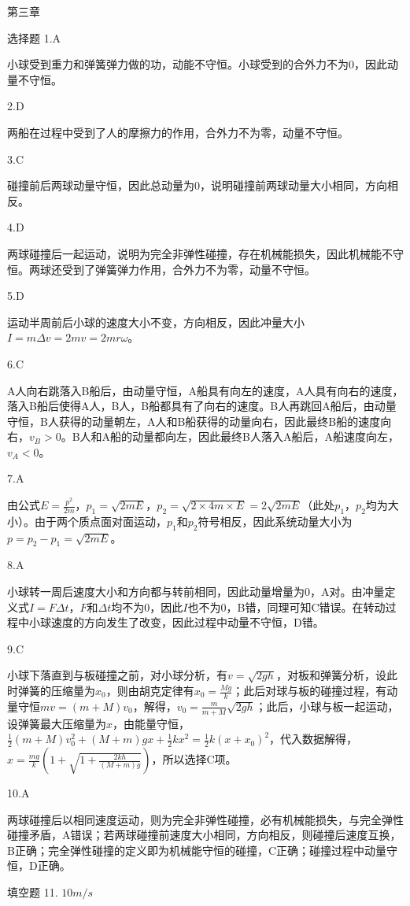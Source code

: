 \documentclass[a4paper,fleqn,twocolumn]{ctexart}
\begin{document}
\begin{section}{第三章}
\begin{subsection}{选择题}
1.A

小球受到重力和弹簧弹力做的功，动能不守恒。小球受到的合外力不为0，因此动量不守恒。

2.D

两船在过程中受到了人的摩擦力的作用，合外力不为零，动量不守恒。

3.C

碰撞前后两球动量守恒，因此总动量为0，说明碰撞前两球动量大小相同，方向相反。

4.D

两球碰撞后一起运动，说明为完全非弹性碰撞，存在机械能损失，因此机械能不守恒。两球还受到了弹簧弹力作用，合外力不为零，动量不守恒。

5.D

运动半周前后小球的速度大小不变，方向相反，因此冲量大小\(I=m\Delta v=2mv=2mr \omega\)。

6.C

A人向右跳落入B船后，由动量守恒，A船具有向左的速度，A人具有向右的速度，落入B船后使得A人，B人，B船都具有了向右的速度。B人再跳回A船后，由动量守恒，B人获得的动量朝左，A人和B船获得的动量向右，因此最终B船的速度向右，\(v_B>0\)。B人和A船的动量都向左，因此最终B人落入A船后，A船速度向左，\(v_A<0\)。

7.A

由公式\(E=\frac{p^2}{2m}\)，\(p_1=\sqrt{2mE}\)，\(p_2=\sqrt{2\times 4m\times E}=2\sqrt{2mE}\)（此处\(p_1\)，\(p_2\)均为大小）。由于两个质点面对面运动，\(p_1\)和\(p_2\)符号相反，因此系统动量大小为\(p=p_2-p_1=\sqrt{2mE}\)。

8.A

小球转一周后速度大小和方向都与转前相同，因此动量增量为0，A对。由冲量定义式\(I=F\Delta t\)，\(F\)和\(\Delta t\)均不为0，因此\(I\)也不为0，B错，同理可知C错误。在转动过程中小球速度的方向发生了改变，因此过程中动量不守恒，D错。

9.C

小球下落直到与板碰撞之前，对小球分析，有\(v=\sqrt{2gh}\)，对板和弹簧分析，设此时弹簧的压缩量为\(x_0\)，则由胡克定律有\(x_0=\frac{Mg}{k}\)；此后对球与板的碰撞过程，有动量守恒\(mv=(m+M)v_0\)，解得，\(v_0=\frac{m}{m+M}\sqrt{2gh}\)；此后，小球与板一起运动，设弹簧最大压缩量为\(x\)，由能量守恒，\(\frac{1}{2}(m+M)v_0^2+(M+m)gx+\frac{1}{2}kx^2=\frac{1}{2}k(x+x_0)^2\)，代入数据解得，\(x=\frac{mg}{k}(1+\sqrt{1+\frac{2kh}{(M+m)g}})\)，所以选择C项。

10.A

两球碰撞后以相同速度运动，则为完全非弹性碰撞，必有机械能损失，与完全弹性碰撞矛盾，A错误；若两球碰撞前速度大小相同，方向相反，则碰撞后速度互换，B正确；完全弹性碰撞的定义即为机械能守恒的碰撞，C正确；碰撞过程中动量守恒，D正确。
\end{subsection}
\begin{subsection}{填空题}
11. $10m/s$


\end{subsection}
\end{section}
\end{document}
